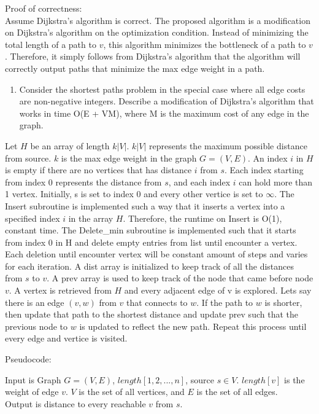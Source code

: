 \documentclass[11pt]{article}
\providecommand{\tightlist}{%
      \setlength{\itemsep}{0pt}\setlength{\parskip}{0pt}}
\begin{document}
    Proof of correctness:\\
Assume Dijkstra's algorithm is correct. The proposed algorithm is a
modification on Dijkstra's algorithm on the optimization condition.
Instead of minimizing the total length of a path to \(v\), this
algorithm minimizes the bottleneck of a path to \(v\). Therefore, it
simply follows from Dijkstra's algorithm that the algorithm will
correctly output paths that minimize the max edge weight in a path.

    \begin{enumerate}
\def\labelenumi{\arabic{enumi}.}
\setcounter{enumi}{5}
\tightlist
\item
  Consider the shortest paths problem in the special case where all edge
  costs are non-negative integers. Describe a modification of Dijkstra's
  algorithm that works in time O(\textbar E\textbar{} +
  \textbar V\textbar M), where M is the maximum cost of any edge in the
  graph.
\end{enumerate}

    Let \(H\) be an array of length \(k|V|\). \(k|V|\) represents the
maximum possible distance from source. \(k\) is the max edge weight in
the graph \(G=(V,E)\). An index \(i\) in \(H\) is empty if there are no
vertices that has distance \(i\) from \(s\). Each index starting from
index 0 represents the distance from \(s\), and each index \(i\) can
hold more than 1 vertex. Initially, s is set to index 0 and every other
vertice is set to \(\infty\). The Insert subroutine is implemented such
a way that it inserts a vertex into a specified index \(i\) in the array
\(H\). Therefore, the runtime on Insert is O(1), constant time. The
Delete\_min subroutine is implemented such that it starts from index 0
in H and delete empty entries from list until encounter a vertex. Each
deletion until encounter vertex will be constant amount of steps and
varies for each iteration. A dist array is initialized to keep track of
all the distances from \(s\) to \(v\). A prev array is used to keep
track of the node that came before node \(v\). A vertex is retrieved
from \(H\) and every adjacent edge of v is explored. Lets say there is
an edge \((v,w)\) from \(v\) that connects to \(w\). If the path to
\(w\) is shorter, then update that path to the shortest distance and
update prev such that the previous node to \(w\) is updated to reflect
the new path. Repeat this process until every edge and vertice is
visited.

Pseudocode:

Input is Graph \(G=(V,E)\), \(length[1, 2, ..., n]\), source
\(s \in V\). \(length[v]\) is the weight of edge \(v\). \(V\) is the set
of all vertices, and \(E\) is the set of all edges.\\
Output is distance to every reachable \(v\) from \(s\).
\end{document}
